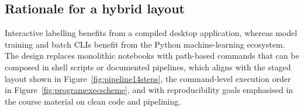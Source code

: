 \subsection{Rationale for a hybrid layout}

Interactive labelling benefits from a compiled desktop application, whereas model training and batch CLIs benefit from the Python machine-learning ecosystem. The design replaces monolithic notebooks with path-based commands that can be composed in shell scripts or documented pipelines, which aligns with the staged layout shown in Figure~\ref{fig:pipeline14steps}, the command-level execution order in Figure~\ref{fig:programexecscheme}, and with reproducibility goals emphasised in the course material on clean code and pipelining.
